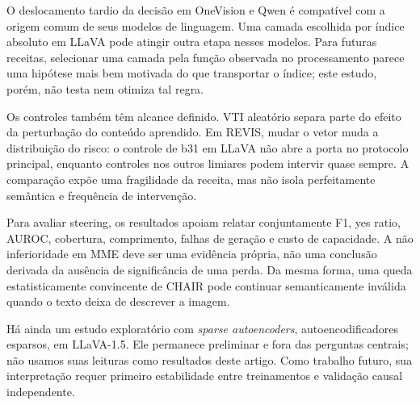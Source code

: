 O deslocamento tardio da decisão em OneVision e Qwen é compatível com a origem comum de seus modelos de linguagem. Uma camada escolhida por índice absoluto em LLaVA pode atingir outra etapa nesses modelos. Para futuras receitas, selecionar uma camada pela função observada no processamento parece uma hipótese mais bem motivada do que transportar o índice; este estudo, porém, não testa nem otimiza tal regra.

Os controles também têm alcance definido. VTI aleatório separa parte do efeito da perturbação do conteúdo aprendido. Em REVIS, mudar o vetor muda a distribuição do risco: o controle de b31 em LLaVA não abre a porta no protocolo principal, enquanto controles nos outros limiares podem intervir quase sempre. A comparação expõe uma fragilidade da receita, mas não isola perfeitamente semântica e frequência de intervenção.

Para avaliar steering, os resultados apoiam relatar conjuntamente F1, yes ratio, AUROC, cobertura, comprimento, falhas de geração e custo de capacidade. A não inferioridade em MME deve ser uma evidência própria, não uma conclusão derivada da ausência de significância de uma perda. Da mesma forma, uma queda estatisticamente convincente de CHAIR pode continuar semanticamente inválida quando o texto deixa de descrever a imagem.

Há ainda um estudo exploratório com \textit{sparse autoencoders}, autoencodificadores esparsos, em LLaVA-1.5. Ele permanece preliminar e fora das perguntas centrais; não usamos suas leituras como resultados deste artigo. Como trabalho futuro, sua interpretação requer primeiro estabilidade entre treinamentos e validação causal independente.
